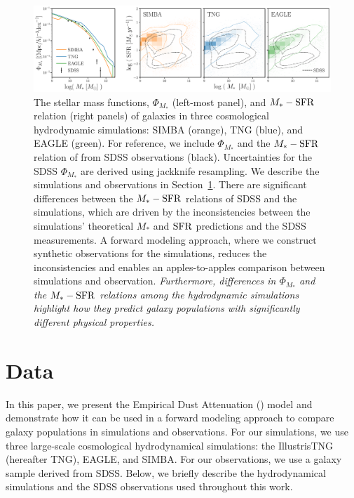 \begin{figure}
\begin{center}
    \includegraphics[width=\textwidth]{figs/smf_m_sfr.pdf}
    \caption{\label{fig:smf_msfr}
    The stellar mass functions, $\Phi_{M_*}$ (left-most panel), and $M_*-{\rm SFR}$
    relation (right panels) of galaxies in three cosmological hydrodynamic 
    simulations: SIMBA (orange), TNG (blue), and EAGLE (green). 
    For reference, we include $\Phi_{M_*}$ and the $M_*-{\rm SFR}$ relation of from
    SDSS observations (black).
    Uncertainties for the SDSS $\Phi_{M_*}$ are derived using jackknife
    resampling. 
    We describe the simulations and observations in Section~\ref{sec:sims}. 
    There are significant differences between the $M_*-{\rm SFR}$ relations of
    SDSS and the simulations, which are driven by the inconsistencies
    between the simulations' theoretical $M_*$ and ${\rm SFR}$ predictions
    and the SDSS measurements.
    A forward modeling approach, where we construct synthetic observations
    for the simulations, reduces the inconsistencies and enables an
    apples-to-apples comparison between simulations and observation. 
    \emph{Furthermore, differences
    in $\Phi_{M_*}$ and the $M_*-{\rm SFR}$ relations among the hydrodynamic simulations 
    highlight how they predict galaxy populations with significantly different
    physical properties.} 
    }
\end{center}
\end{figure}

\section{Data}\label{sec:sims}
In this paper, we present the Empirical Dust Attenuation (\eda) model and
demonstrate how it can be used in a forward modeling approach to compare galaxy
populations in simulations and observations. For our simulations, we use three large-scale
cosmological hydrodynamical simulations: the IllustrisTNG (hereafter TNG),
EAGLE, and SIMBA. For our observations, we use a galaxy sample derived from
SDSS. Below, we briefly describe the hydrodynamical simulations and the SDSS
observations used throughout this work.

